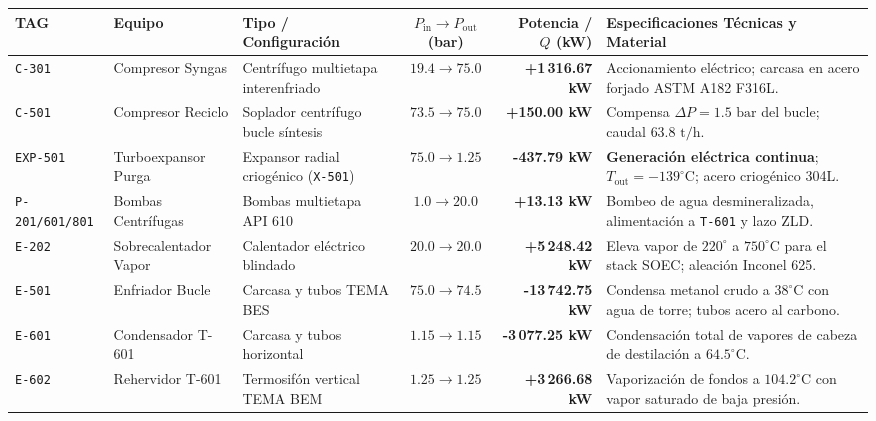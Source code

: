 \documentclass[10pt,landscape]{article}
\begin{document}
\scriptsize
\renewcommand{\arraystretch}{1.18}
\begin{tabularx}{\textwidth}{l p{2.8cm} p{2.8cm} c r X}
  \toprule
  \rowcolor{tableheader}
  \textbf{\color{white}TAG} & \textbf{\color{white}Equipo} & \textbf{\color{white}Tipo / Configuración} & \textbf{\color{white}$P_{\text{in}} \to P_{\text{out}}$ (bar)} & \textbf{\color{white}Potencia / $Q$ (kW)} & \textbf{\color{white}Especificaciones Técnicas y Material} \\
  \midrule
  \rowcolor{roweven}
  \texttt{C-301} & Compresor Syngas & Centrífugo multietapa interenfriado & $19.4 \to 75.0$ & \textbf{+1\,316.67 kW} & Accionamiento eléctrico; carcasa en acero forjado ASTM A182 F316L. \\
  \rowcolor{rowodd}
  \texttt{C-501} & Compresor Reciclo & Soplador centrífugo bucle síntesis & $73.5 \to 75.0$ & \textbf{+150.00 kW} & Compensa $\Delta P = 1.5\text{ bar}$ del bucle; caudal $63.8\text{ t/h}$. \\
  \rowcolor{badgegreen}
  \texttt{EXP-501} & Turboexpansor Purga & Expansor radial criogénico (\texttt{X-501}) & $75.0 \to 1.25$ & \textbf{-437.79 kW} & \textbf{Generación eléctrica continua}; $T_{\text{out}} = -139^\circ\text{C}$; acero criogénico 304L. \\
  \rowcolor{rowodd}
  \texttt{P-201/601/801} & Bombas Centrífugas & Bombas multietapa API 610 & $1.0 \to 20.0$ & \textbf{+13.13 kW} & Bombeo de agua desmineralizada, alimentación a \texttt{T-601} y lazo ZLD. \\
  \rowcolor{roweven}
  \texttt{E-202} & Sobrecalentador Vapor & Calentador eléctrico blindado & $20.0 \to 20.0$ & \textbf{+5\,248.42 kW} & Eleva vapor de $220^\circ$ a $750^\circ\text{C}$ para el stack SOEC; aleación Inconel 625. \\
  \rowcolor{rowodd}
  \texttt{E-501} & Enfriador Bucle & Carcasa y tubos TEMA BES & $75.0 \to 74.5$ & \textbf{-13\,742.75 kW} & Condensa metanol crudo a $38^\circ\text{C}$ con agua de torre; tubos acero al carbono. \\
  \rowcolor{roweven}
  \texttt{E-601} & Condensador T-601 & Carcasa y tubos horizontal & $1.15 \to 1.15$ & \textbf{-3\,077.25 kW} & Condensación total de vapores de cabeza de destilación a $64.5^\circ\text{C}$. \\
  \rowcolor{rowodd}
  \texttt{E-602} & Rehervidor T-601 & Termosifón vertical TEMA BEM & $1.25 \to 1.25$ & \textbf{+3\,266.68 kW} & Vaporización de fondos a $104.2^\circ\text{C}$ con vapor saturado de baja presión. \\
  \bottomrule
\end{tabularx}
\end{document}
